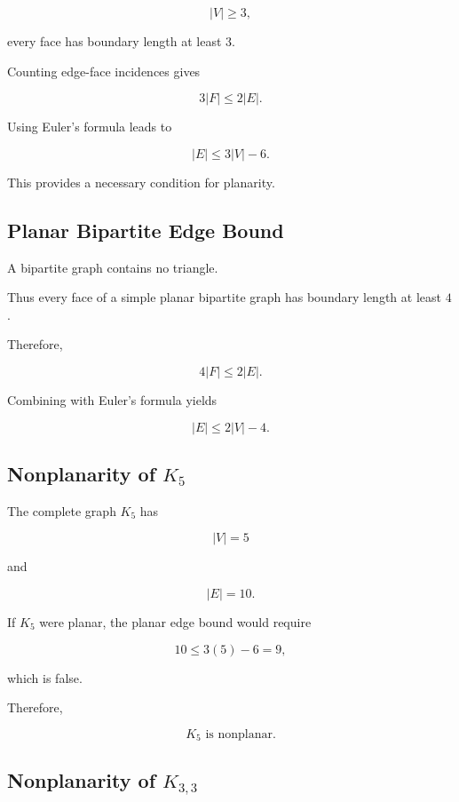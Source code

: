 \[
|V|\geq3,
\]

every face has boundary length at least \(3\).

Counting edge-face incidences gives

\[
3|F|\leq2|E|.
\]

Using Euler's formula leads to

\[
\boxed{
|E|
\leq
3|V|-6.
}
\]

This provides a necessary condition for planarity.

\subsection{Planar Bipartite Edge Bound}
\label{subsec:planar-bipartite-bound}

A bipartite graph contains no triangle.

Thus every face of a simple planar bipartite graph has boundary length
at least \(4\).

Therefore,

\[
4|F|\leq2|E|.
\]

Combining with Euler's formula yields

\[
\boxed{
|E|
\leq
2|V|-4.
}
\]

\subsection{Nonplanarity of \(K_5\)}
\label{subsec:k5-nonplanar}

The complete graph \(K_5\) has

\[
|V|=5
\]

and

\[
|E|=10.
\]

If \(K_5\) were planar, the planar edge bound would require

\[
10\leq3(5)-6=9,
\]

which is false.

Therefore,

\[
\boxed{
K_5\text{ is nonplanar}.
}
\]

\subsection{Nonplanarity of \(K_{3,3}\)}
\label{subsec:k33-nonplanar}

